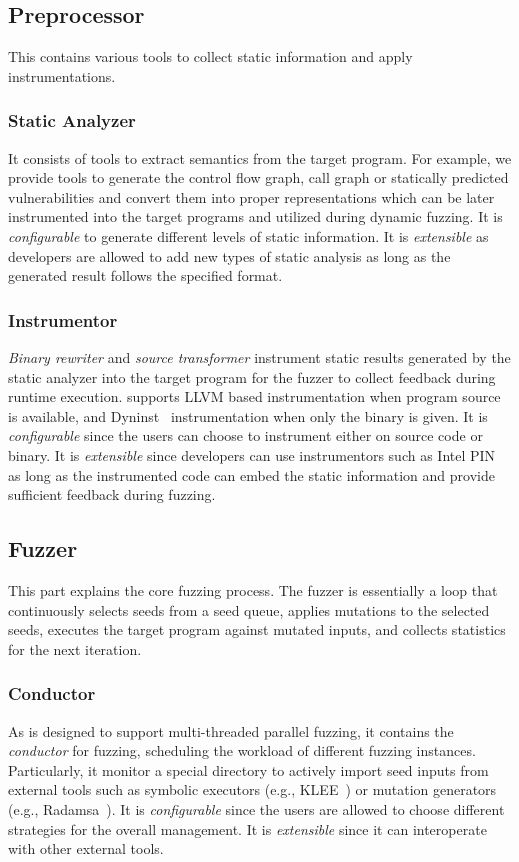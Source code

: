\subsection{Preprocessor}
This contains various tools to collect static information and apply instrumentations.


\subsubsection{Static Analyzer}\label{sec:static_analysis}
It consists of tools to extract semantics from the target program.
For example, we provide tools to generate the control flow graph, call graph or statically predicted vulnerabilities and convert them into proper representations which can be later instrumented into the target programs and utilized during dynamic fuzzing.
It is \textit{configurable} to generate different levels of static information. It is \textit{extensible} as developers are allowed to add new types of static analysis as long as the generated result follows the specified format.


\subsubsection{Instrumentor}
\emph{Binary rewriter} and \emph{source transformer} instrument static results generated by the static analyzer into the target program for the fuzzer to collect feedback during runtime execution.
{\FOT} supports LLVM based instrumentation when program source is available, and Dyninst~\cite{dyninst} instrumentation when only the binary is given.
It is \textit{configurable} since the users can choose to instrument either on source code or binary.
It is \textit{extensible} since developers can use instrumentors such as Intel PIN~\cite{pin} as long as the instrumented code can embed the static information and provide sufficient feedback during fuzzing.

\subsection{Fuzzer}
This part explains the core fuzzing process. 
The fuzzer is essentially a loop that continuously selects seeds from a seed queue, applies mutations to the selected seeds, executes the target program against mutated inputs, and collects statistics for the next iteration.

\subsubsection{Conductor}
As {\FOT} is designed to support multi-threaded parallel fuzzing, it contains the \emph{conductor} for fuzzing, scheduling the workload of different fuzzing instances.
Particularly, it monitor a special directory to actively import seed inputs from external tools such as symbolic executors (e.g., KLEE~\cite{klee}) or mutation generators (e.g., Radamsa~\cite{radamsa}).
It is \textit{configurable} since the users are allowed to choose different strategies for the overall management.
It is \textit{extensible} since it can interoperate with other external tools.


